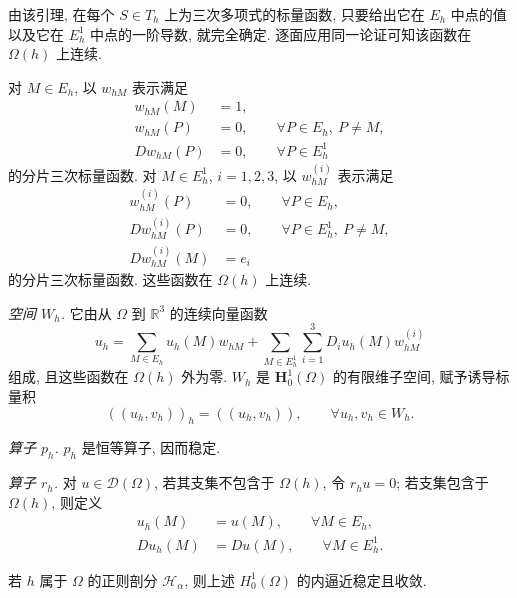 由该引理, 在每个 $S\in T_h$ 上为三次多项式的标量函数, 只要给出它在 $E_h$ 中点的值以及它在 $E_h^1$ 中点的一阶导数, 就完全确定. 逐面应用同一论证可知该函数在 $\Omega(h)$ 上连续.

对 $M\in E_h$, 以 $w_{hM}$ 表示满足
\begin{equation}
\begin{aligned}
w_{hM}(M)&=1,\\
w_{hM}(P)&=0,\qquad\forall P\in E_h,\ P\neq M,\\
Dw_{hM}(P)&=0,\qquad\forall P\in E_h^1
\end{aligned}
\label{eq:ch1-cubic-value-basis}
\end{equation}
的分片三次标量函数. 对 $M\in E_h^1$, $i=1,2,3$, 以 $w_{hM}^{(i)}$ 表示满足
\begin{equation}
\begin{aligned}
w_{hM}^{(i)}(P)&=0,\qquad\forall P\in E_h,\\
Dw_{hM}^{(i)}(P)&=0,\qquad\forall P\in E_h^1,\ P\neq M,\\
Dw_{hM}^{(i)}(M)&=e_i
\end{aligned}
\label{eq:ch1-cubic-derivative-basis}
\end{equation}
的分片三次标量函数. 这些函数在 $\Omega(h)$ 上连续.

\emph{空间 $W_h$.} 它由从 $\Omega$ 到 $\mathbb R^3$ 的连续向量函数
\begin{equation}
u_h=\sum_{M\in E_h}u_h(M)w_{hM}
+\sum_{M\in E_h^1}\sum_{i=1}^3D_iu_h(M)w_{hM}^{(i)}
\label{eq:ch1-cubic-wh-representation}
\end{equation}
组成, 且这些函数在 $\Omega(h)$ 外为零. $W_h$ 是
$\mathbf H_0^1(\Omega)$ 的有限维子空间, 赋予诱导标量积
\begin{equation}
((u_h,v_h))_h=((u_h,v_h)),
\qquad\forall u_h,v_h\in W_h.
\label{eq:ch1-cubic-wh-product}
\end{equation}

\emph{算子 $p_h$.} $p_h$ 是恒等算子, 因而稳定.

\emph{算子 $r_h$.} 对 $u\in\mathcal D(\Omega)$, 若其支集不包含于
$\Omega(h)$, 令 $r_hu=0$; 若支集包含于 $\Omega(h)$, 则定义
\begin{equation}
\begin{aligned}
u_h(M)&=u(M),\qquad\forall M\in E_h,\\
Du_h(M)&=Du(M),\qquad\forall M\in E_h^1.
\end{aligned}
\label{eq:ch1-cubic-restriction}
\end{equation}

\begin{Proposition}
\label{prop:ch1-cubic-h01-convergence}
若 $h$ 属于 $\Omega$ 的正则剖分 $\mathcal H_\alpha$, 则上述
$H_0^1(\Omega)$ 的内逼近稳定且收敛.
\end{Proposition}

